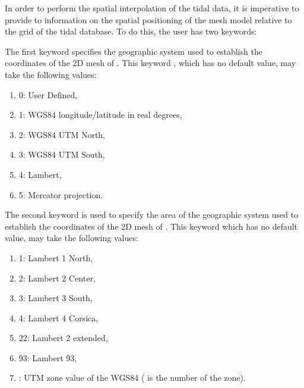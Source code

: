  In order to perform the spatial interpolation of the tidal data, it is imperative to provide to  information on the spatial positioning of the mesh model relative to the grid of the tidal database. To do this, the user has two keywords:

 The first keyword specifies the geographic system used to establish the coordinates of the 2D mesh of . This keyword , which has no default value, may take the following values:

\begin{enumerate}
\item [\nonumber] 0: User Defined,

\item [\nonumber] 1: WGS84 longitude/latitude in real degrees,

\item [\nonumber] 2: WGS84 UTM North,

\item [\nonumber] 3: WGS84 UTM South,

\item [\nonumber] 4: Lambert,

\item [\nonumber] 5: Mercator projection.
\end{enumerate}

 The second keyword is used to specify the area of the geographic system used to establish the coordinates of the 2D mesh of . This keyword  which has no default value, may take the following values:

\begin{enumerate}
\item [\nonumber] 1: Lambert 1 North,

\item [\nonumber] 2: Lambert 2 Center,

\item [\nonumber] 3: Lambert 3 South,

\item [\nonumber] 4: Lambert 4 Corsica,

\item [\nonumber] 22: Lambert 2 extended,

\item [\nonumber] 93: Lambert 93,

\item [\nonumber] : UTM zone value of the WGS84 ( is the number of the zone).
\end{enumerate}


